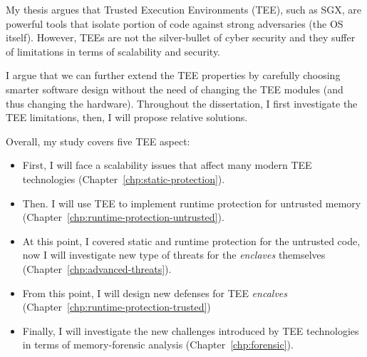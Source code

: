 My thesis argues that Trusted Execution Environments (TEE), such as SGX, are 
powerful tools that isolate portion of code against strong adversaries (\ie the 
OS itself).
However, TEEs are not the silver-bullet of cyber security and they suffer of 
limitations in terms of scalability and security.

I argue that we can further extend the TEE properties by carefully choosing 
smarter software design without the need of changing the TEE modules (and thus 
changing the hardware).
Throughout the dissertation, I first investigate the TEE limitations, 
then, I will propose relative solutions.

Overall, my study covers five TEE aspect:
\begin{itemize}
	\item {} First, I will face a 
	scalability issues that affect many modern	TEE technologies 
	(Chapter~\ref{chp:static-protection}).
	
	\item {} Then. I will use TEE to 
	implement runtime protection for untrusted memory 
	(Chapter~\ref{chp:runtime-protection-untrusted}).
	
	\item {} At this point, I covered static and runtime 
	protection for the untrusted code, now I will investigate new type of 
	threats for the \emph{enclaves} themselves 	
	(Chapter~\ref{chp:advanced-threats}).
	
	\item {} From this point, I will 
	design new defenses for TEE \emph{encalves} 	
	(Chapter~\ref{chp:runtime-protection-trusted})
	
	\item {} Finally, I will investigate the new 
	challenges introduced by TEE technologies in terms of memory-forensic 
	analysis (Chapter~\ref{chp:forensic}).
\end{itemize}

